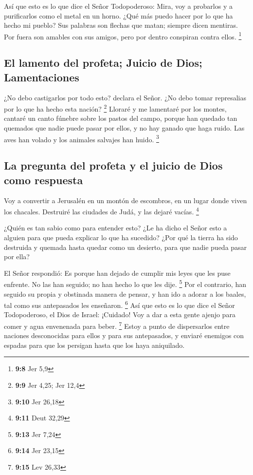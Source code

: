  Así que esto es lo que dice el Señor Todopoderoso: Mira,
voy a probarlos y a purificarlos como el metal en un horno. ¿Qué más
puedo hacer por lo que ha hecho mi pueblo?  Sus palabras
son flechas que matan; siempre dicen mentiras. Por fuera son amables con
sus amigos, pero por dentro conspiran contra ellos. \footnote{\textbf{9:8}
  Jer 5,9}

\hypertarget{el-lamento-del-profeta-juicio-de-dios-lamentaciones}{%
\subsection{El lamento del profeta; Juicio de Dios;
Lamentaciones}\label{el-lamento-del-profeta-juicio-de-dios-lamentaciones}}

 ¿No debo castigarlos por todo esto? declara el Señor. ¿No
debo tomar represalias por lo que ha hecho esta nación? \footnote{\textbf{9:9}
  Jer 4,25; Jer 12,4}  Lloraré y me lamentaré por los
montes, cantaré un canto fúnebre sobre los pastos del campo, porque han
quedado tan quemados que nadie puede pasar por ellos, y no hay ganado
que haga ruido. Las aves han volado y los animales salvajes han huido.
\footnote{\textbf{9:10} Jer 26,18}

\hypertarget{la-pregunta-del-profeta-y-el-juicio-de-dios-como-respuesta}{%
\subsection{La pregunta del profeta y el juicio de Dios como
respuesta}\label{la-pregunta-del-profeta-y-el-juicio-de-dios-como-respuesta}}

 Voy a convertir a Jerusalén en un montón de escombros,
en un lugar donde viven los chacales. Destruiré las ciudades de Judá, y
las dejaré vacías. \footnote{\textbf{9:11} Deut 32,29}

 ¿Quién es tan sabio como para entender esto? ¿Le ha
dicho el Señor esto a alguien para que pueda explicar lo que ha
sucedido? ¿Por qué la tierra ha sido destruida y quemada hasta quedar
como un desierto, para que nadie pueda pasar por ella?

 El Señor respondió: Es porque han dejado de cumplir mis
leyes que les puse enfrente. No las han seguido; no han hecho lo que les
dije. \footnote{\textbf{9:13} Jer 7,24}  Por el
contrario, han seguido su propia y obstinada manera de pensar, y han ido
a adorar a los baales, tal como sus antepasados les enseñaron.
\footnote{\textbf{9:14} Jer 23,15}  Así que esto es lo
que dice el Señor Todopoderoso, el Dios de Israel: ¡Cuidado! Voy a dar a
esta gente ajenjo para comer y agua envenenada para beber. \footnote{\textbf{9:15}
  Lev 26,33}  Estoy a punto de dispersarlos entre
naciones desconocidas para ellos y para sus antepasados, y enviaré
enemigos con espadas para que los persigan hasta que los haya
aniquilado.

